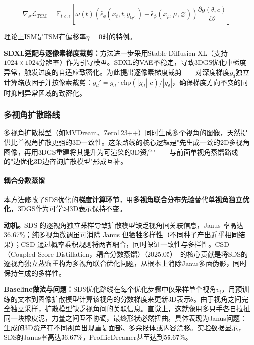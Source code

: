 \begin{equation}
\nabla_\theta \mathcal{L}_{\text{TSM}} = \mathbb{E}_{t,c,\epsilon}\left[\omega(t)(\hat{\epsilon}_\phi(x_t, t, y_\text{tgt}) - \hat{\epsilon}_\phi(x_\mu, \mu, \varnothing))\frac{\partial g(\theta, c)}{\partial \theta}\right]
\end{equation}

理论上ISM是TSM在偏移率$\eta=0$时的特例。

\textbf{SDXL适配与逐像素梯度裁剪：}方法进一步采用Stable Diffusion XL（支持$1024\times 1024$分辨率）作为引导模型。SDXL的VAE不稳定，导致3DGS优化中梯度异常，触发过度的自适应致密化。为此提出逐像素梯度裁剪——对深度梯度$g_d$独立计算缩放因子并按像素裁剪：$g_d' = g_d \cdot \text{clip}(|g_d|, c)/|g_d|$，确保梯度方向不变的同时抑制异常区域的致密化。

\subsubsection{多视角扩散路线}

多视角扩散模型（如MVDream、Zero123++）同时生成多个视角的图像，天然提供比单视角扩散更强的3D一致性。这条路线的核心逻辑是"先生成一致的2D多视角图像，再用3DGS重建将其提升为可渲染的3D资产"——与前面单视角蒸馏路线的"边优化3D边咨询扩散模型"形成互补。

\paragraph{耦合分数蒸馏}

本方法修改了SDS优化的\textbf{梯度计算环节}，用\textbf{多视角联合分布先验}替代\textbf{单视角独立优化}，3DGS作为可学习3D表示保持不变。

\textbf{动机。}SDS 的逐视角独立采样导致扩散模型缺乏视角间关联信息，Janus 率高达 36.67\%；纯多视角微调虽可消除 Janus 但牺牲多样性（不同种子产出近乎相同结果）；CSD 通过概率乘积规则将两者耦合，同时保证一致性与多样性。CSD（Coupled Score Distillation，耦合分数蒸馏）（2025.05）~\cite{2505_04262}的核心贡献是将SDS的逐视角独立蒸馏重构为多视角联合优化问题，从根本上消除Janus多面伪影，同时保持生成的多样性。

\textbf{Baseline做法与问题：}SDS优化路线在每个优化步骤中仅采样单个视角$v_i$，用预训练的文本到图像扩散模型计算该视角的分数梯度来更新3D表示$\theta$。由于视角之间完全独立采样，扩散模型缺乏视角间的关联信息。直觉上，这就像用多只手各自拉扯同一块橡皮泥，力量之间互不协调，最终形状必然扭曲。具体表现为Janus问题：生成的3D资产在不同视角出现重复面部、多余肢体或内容漂移。实验数据显示，SDS的Janus率高达36.67\%，ProlificDreamer甚至达到56.67\%。


